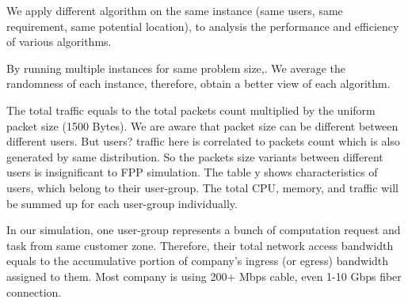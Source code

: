 \documentclass[10pt,journal,compsoc]{IEEEtran}
\begin{document}
We apply different algorithm on the same instance (same users, same requirement, same potential location), to analysis the performance and efficiency of various algorithms.

By running multiple instances for same problem size,. We average the randomness of each instance, therefore, obtain a better view of each algorithm.
\iffalse
\begin{table}
\renewcommand{\arraystretch}{0.7 }
\caption{User Profile}
\label{userProfile}
\centering
{}
\end{table}

The total traffic equals to the total packets count multiplied by the uniform packet size (1500 Bytes). We are aware that packet size can be different between different users. But users? traffic here is correlated to packets count which is also generated by same distribution. So the packets size variants between different users is insignificant to FPP simulation.
The table y shows characteristics of users, which belong to their user-group. The total CPU, memory, and traffic will be summed up for each user-group individually.

In our simulation, one user-group represents a bunch of computation request and task from same customer zone.  Therefore, their total network access bandwidth equals to the accumulative portion of company's ingress (or egress) bandwidth assigned to them. Most company is using 200+ Mbps cable, even 1-10 Gbps fiber connection. 
\end{document}
